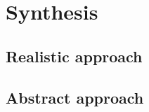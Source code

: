 \section{Synthesis}\label{sec:synthesis}

\subsection{Realistic approach}

\subsubsection{}

\subsubsection{}

\subsubsection{}

\subsubsection{}

\subsection{Abstract approach}

\subsubsection{}

\subsubsection{}

\subsubsection{}

\subsubsection{}
